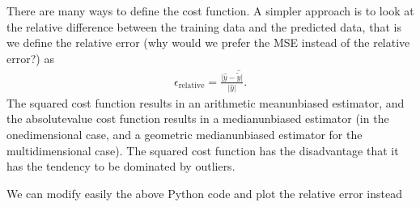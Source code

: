 \documentclass[letterpaper,10pt,english]{sphinxmanual}
\begin{document}
There are many ways to define the cost function. A simpler approach is to look at the relative difference between the training data and the predicted data, that is we define
the relative error (why would we prefer the MSE instead of the relative error?) as
\begin{equation*}
\begin{split}
\epsilon_{\mathrm{relative}}= \frac{\vert \hat{y} -\hat{\tilde{y}}\vert}{\vert \hat{y}\vert}.
\end{split}
\end{equation*}
The squared cost function results in an arithmetic mean\sphinxhyphen{}unbiased
estimator, and the absolute\sphinxhyphen{}value cost function results in a
median\sphinxhyphen{}unbiased estimator (in the one\sphinxhyphen{}dimensional case, and a
geometric median\sphinxhyphen{}unbiased estimator for the multi\sphinxhyphen{}dimensional
case). The squared cost function has the disadvantage that it has the tendency
to be dominated by outliers.

We can modify easily the above Python code and plot the relative error instead
\end{document}
